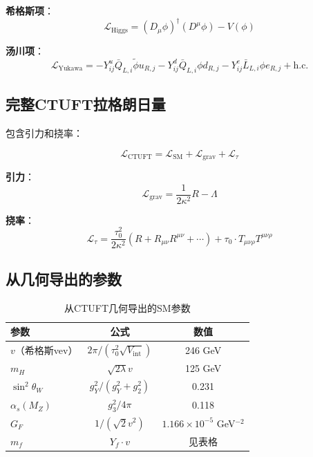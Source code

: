 \textbf{希格斯项}：
\begin{equation}
    \mathcal{L}_{\text{Higgs}} = (D_\mu \phi)^\dagger(D^\mu \phi) - V(\phi)
\end{equation}

\textbf{汤川项}：
\begin{equation}
    \mathcal{L}_{\text{Yukawa}} = -Y_{ij}^u \bar{Q}_{L,i} \tilde{\phi} u_{R,j} - Y_{ij}^d \bar{Q}_{L,i} \phi d_{R,j} - Y_{ij}^e \bar{L}_{L,i} \phi e_{R,j} + \text{h.c.}
\end{equation}

\subsection{完整CTUFT拉格朗日量}

包含引力和挠率：

\begin{equation}
    \mathcal{L}_{\text{CTUFT}} = \mathcal{L}_{\text{SM}} + \mathcal{L}_{\text{grav}} + \mathcal{L}_{\tau}
\end{equation}

\textbf{引力}：
\begin{equation}
    \mathcal{L}_{\text{grav}} = \frac{1}{2\kappa^2}R - \Lambda
\end{equation}

\textbf{挠率}：
\begin{equation}
    \mathcal{L}_{\tau} = \frac{\tau_0^2}{2\kappa^2}\left(R + R_{\mu\nu}R^{\mu\nu} + \cdots\right) + \tau_0 \cdot T_{\mu\nu\rho}T^{\mu\nu\rho}
\end{equation}

\subsection{从几何导出的参数}

\begin{table}[htbp]
\centering
\caption{从CTUFT几何导出的SM参数}
\begin{tabular}{@{}lcc@{}}
\hline
\textbf{参数} & \textbf{公式} & \textbf{数值} \\
\hline
$v$（希格斯vev） & $2\pi/(\tau_0^2\sqrt{V_{\text{int}}})$ & 246 GeV \\
$m_H$ & $\sqrt{2\lambda}v$ & 125 GeV \\
$\sin^2\theta_W$ & $g_Y^2/(g_Y^2+g_2^2)$ & 0.231 \\
$\alpha_s(M_Z)$ & $g_3^2/4\pi$ & 0.118 \\
$G_F$ & $1/(\sqrt{2}v^2)$ & $1.166 \times 10^{-5}$ GeV$^{-2}$ \\
$m_f$ & $Y_f \cdot v$ & 见表格 \\
\hline
\end{tabular}
\end{table}


